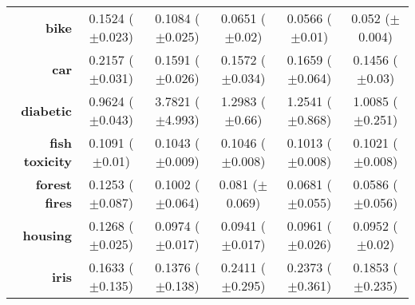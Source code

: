 \begin{table}[htb]
{\begin{tabular}{r|ccccc}
                  \textbf{bike}                & \cellcolor[rgb]{ .973,  .412,  .42}0.1524 ($\pm$0.023)       & \cellcolor[rgb]{ .988,  .671,  .471}0.1084 ($\pm$0.025) & \cellcolor[rgb]{ 1,  .922,  .518}0.0651 ($\pm$0.02)     & \cellcolor[rgb]{ .6,  .804,  .494}0.0566 ($\pm$0.01)    & \cellcolor[rgb]{ .388,  .745,  .482}0.052 ($\pm$0.004)  \\
                  \textbf{car}                 & \cellcolor[rgb]{ .973,  .412,  .42}0.2157 ($\pm$0.031)       & \cellcolor[rgb]{ 1,  .922,  .518}0.1591 ($\pm$0.026)    & \cellcolor[rgb]{ .91,  .894,  .51}0.1572 ($\pm$0.034)   & \cellcolor[rgb]{ 1,  .863,  .51}0.1659 ($\pm$0.064)     & \cellcolor[rgb]{ .388,  .745,  .482}0.1456 ($\pm$0.03)  \\
                  \textbf{diabetic}            & \cellcolor[rgb]{ .388,  .745,  .482}0.9624 ($\pm$0.043)      & \cellcolor[rgb]{ .973,  .412,  .42}3.7821 ($\pm$4.993)  & \cellcolor[rgb]{ 1,  .914,  .518}1.2983 ($\pm$0.66)     & \cellcolor[rgb]{ 1,  .922,  .518}1.2541 ($\pm$0.868)    & \cellcolor[rgb]{ .482,  .773,  .486}1.0085 ($\pm$0.251) \\
                  \textbf{fish toxicity}       & \cellcolor[rgb]{ .973,  .412,  .42}0.1091 ($\pm$0.01)        & \cellcolor[rgb]{ 1,  .922,  .518}0.1043 ($\pm$0.009)    & \cellcolor[rgb]{ 1,  .894,  .514}0.1046 ($\pm$0.008)    & \cellcolor[rgb]{ .388,  .745,  .482}0.1013 ($\pm$0.008) & \cellcolor[rgb]{ .549,  .792,  .49}0.1021 ($\pm$0.008)  \\
                  \textbf{forest fires}        & \cellcolor[rgb]{ .973,  .412,  .42}0.1253 ($\pm$0.087)       & \cellcolor[rgb]{ .988,  .702,  .478}0.1002 ($\pm$0.064) & \cellcolor[rgb]{ 1,  .922,  .518}0.081 ($\pm$0.069)     & \cellcolor[rgb]{ .647,  .82,  .494}0.0681 ($\pm$0.055)  & \cellcolor[rgb]{ .388,  .745,  .482}0.0586 ($\pm$0.056) \\
                  \textbf{housing}             & \cellcolor[rgb]{ .973,  .412,  .42}0.1268 ($\pm$0.025)       & \cellcolor[rgb]{ 1,  .902,  .514}0.0974 ($\pm$0.017)    & \cellcolor[rgb]{ .388,  .745,  .482}0.0941 ($\pm$0.017) & \cellcolor[rgb]{ 1,  .922,  .518}0.0961 ($\pm$0.026)    & \cellcolor[rgb]{ .729,  .843,  .502}0.0952 ($\pm$0.02)  \\
                  \textbf{iris}                & \cellcolor[rgb]{ .714,  .839,  .498}0.1633 ($\pm$0.135)      & \cellcolor[rgb]{ .388,  .745,  .482}0.1376 ($\pm$0.138) & \cellcolor[rgb]{ .973,  .412,  .42}0.2411 ($\pm$0.295)  & \cellcolor[rgb]{ .976,  .447,  .427}0.2373 ($\pm$0.361) & \cellcolor[rgb]{ 1,  .922,  .518}0.1853 ($\pm$0.235)    \\

\end{tabular}}
\end{table}
